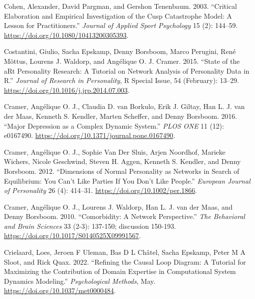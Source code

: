 \documentclass[
  a4paper,
  DIV=11,
  numbers=noendperiod]{scrreprt}
\newlength{\cslhangindent}
\newlength{\cslentryspacingunit} %
\newenvironment{CSLReferences}[2] %
 {%
  \setlength{\parindent}{0pt}
  \ifodd #1
  \let\oldpar\par
  \def\par{\hangindent=\cslhangindent\oldpar}
  \fi
  \setlength{\parskip}{#2\cslentryspacingunit}
 }%
 {}
\begin{document}
\begin{CSLReferences}{1}{0}
\leavevmode{}%
Cohen, Alexander, David Pargman, and Gershon Tenenbaum. 2003.
{``Critical {Elaboration} and {Empirical Investigation} of the {Cusp
Catastrophe Model}: {A Lesson} for {Practitioners}.''} \emph{Journal of
Applied Sport Psychology} 15 (2): 144--59.
\url{https://doi.org/10.1080/10413200305393}.

\leavevmode{}%
Costantini, Giulio, Sacha Epskamp, Denny Borsboom, Marco Perugini, René
Mõttus, Lourens J. Waldorp, and Angélique O. J. Cramer. 2015. {``State
of the {aRt} Personality Research: {A} Tutorial on Network Analysis of
Personality Data in {R}.''} \emph{Journal of Research in Personality}, R
{Special Issue}, 54 (February): 13--29.
\url{https://doi.org/10.1016/j.jrp.2014.07.003}.

\leavevmode{}%
Cramer, Angélique O. J., Claudia D. van Borkulo, Erik J. Giltay, Han L.
J. van der Maas, Kenneth S. Kendler, Marten Scheffer, and Denny
Borsboom. 2016. {``Major Depression as a Complex Dynamic System.''}
\emph{PLOS ONE} 11 (12): e0167490.
\url{https://doi.org/10.1371/journal.pone.0167490}.

\leavevmode{}%
Cramer, Angélique O. J., Sophie Van Der Sluis, Arjen Noordhof, Marieke
Wichers, Nicole Geschwind, Steven H. Aggen, Kenneth S. Kendler, and
Denny Borsboom. 2012. {``Dimensions of Normal Personality as Networks in
Search of Equilibrium: You Can't Like Parties If You Don't Like
People.''} \emph{European Journal of Personality} 26 (4): 414--31.
\url{https://doi.org/10.1002/per.1866}.

\leavevmode{}%
Cramer, Angélique O. J., Lourens J. Waldorp, Han L. J. van der Maas, and
Denny Borsboom. 2010. {``Comorbidity: A Network Perspective.''}
\emph{The Behavioral and Brain Sciences} 33 (2-3): 137-150; discussion
150-193. \url{https://doi.org/10.1017/S0140525X09991567}.

\leavevmode{}%
Crielaard, Loes, Jeroen F Uleman, Bas D L Châtel, Sacha Epskamp, Peter M
A Sloot, and Rick Quax. 2022. {``Refining the Causal Loop Diagram: {A}
Tutorial for Maximizing the Contribution of Domain Expertise in
Computational System Dynamics Modeling.''} \emph{Psychological Methods},
May. \url{https://doi.org/10.1037/met0000484}.


\end{CSLReferences}
\end{document}
